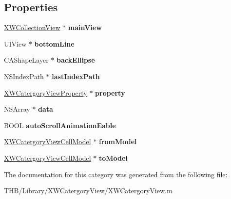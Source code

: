 \subsection*{Properties}
\begin{DoxyCompactItemize}
\item 
\mbox{\label{category_x_w_catergory_view_07_08_a9fcb329586b485c7210a852fcfaf2978}} 
\mbox{\hyperlink{interface_x_w_collection_view}{X\+W\+Collection\+View}} $\ast$ {\bfseries main\+View}
\item 
\mbox{\label{category_x_w_catergory_view_07_08_a8cdb554124ee336e7afa42d5ec93d2e3}} 
U\+I\+View $\ast$ {\bfseries bottom\+Line}
\item 
\mbox{\label{category_x_w_catergory_view_07_08_a60f8966186200cf961ae837173a0890f}} 
C\+A\+Shape\+Layer $\ast$ {\bfseries back\+Ellipse}
\item 
\mbox{\label{category_x_w_catergory_view_07_08_a7b6a21f95dde37e59880e86a7910e325}} 
N\+S\+Index\+Path $\ast$ {\bfseries last\+Index\+Path}
\item 
\mbox{\label{category_x_w_catergory_view_07_08_a22f9a97d40cc3c5cb735cbbc343c7c57}} 
\mbox{\hyperlink{interface_x_w_catergory_view_property}{X\+W\+Catergory\+View\+Property}} $\ast$ {\bfseries property}
\item 
\mbox{\label{category_x_w_catergory_view_07_08_ab2cad45921ef5e16fafc0f72d6976324}} 
N\+S\+Array $\ast$ {\bfseries data}
\item 
\mbox{\label{category_x_w_catergory_view_07_08_a9c865c474c3b47abbfbb7901bf410488}} 
B\+O\+OL {\bfseries auto\+Scroll\+Animation\+Eable}
\item 
\mbox{\label{category_x_w_catergory_view_07_08_a19db55c86e17242cebd0a114c3905188}} 
\mbox{\hyperlink{interface_x_w_catergory_view_cell_model}{X\+W\+Catergory\+View\+Cell\+Model}} $\ast$ {\bfseries from\+Model}
\item 
\mbox{\label{category_x_w_catergory_view_07_08_ab25d3ec2fa84ff209e47f0bddb7bfc1f}} 
\mbox{\hyperlink{interface_x_w_catergory_view_cell_model}{X\+W\+Catergory\+View\+Cell\+Model}} $\ast$ {\bfseries to\+Model}
\end{DoxyCompactItemize}


The documentation for this category was generated from the following file\+:\begin{DoxyCompactItemize}
\item 
T\+H\+B/\+Library/\+X\+W\+Catergory\+View/X\+W\+Catergory\+View.\+m\end{DoxyCompactItemize}
